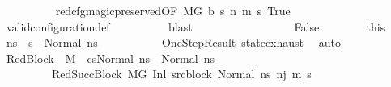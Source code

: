 \begin{isabellebody}
\ \ \ \ \ \ \ \ \isamarkupfalse%
\ red{\isacharunderscore}{\kern0pt}cfg{\isacharunderscore}{\kern0pt}magic{\isacharunderscore}{\kern0pt}preserved{\isacharbrackleft}{\kern0pt}OF\ {\isacartoucheopen}M{\isacharcomma}{\kern0pt}{\isasymLambda}{\isacharcomma}{\kern0pt}{\isasymGamma}{\isacharcomma}{\kern0pt}{\isasymOmega}{\isacharcomma}{\kern0pt}G\ {\isasymturnstile}{\isacharparenleft}{\kern0pt}b{\isacharcomma}{\kern0pt}\ s{}{\isacharparenright}{\kern0pt}\ {\isacharminus}{\kern0pt}n{\isasymrightarrow}{\isacharasterisk}{\kern0pt}\ {\isacharparenleft}{\kern0pt}m{\isacharprime}{\kern0pt}{\isacharcomma}{\kern0pt}\ s{\isacharprime}{\kern0pt}{\isacharparenright}{\kern0pt}{\isacartoucheclose}{\isacharbrackright}{\kern0pt}\ True\ \isanewline
\ \ \ \ \ \ \ \ \isamarkupfalse%
\ valid{\isacharunderscore}{\kern0pt}configuration{\isacharunderscore}{\kern0pt}def\isanewline
\ \ \ \ \ \ \ \ \isamarkupfalse%
\ blast\ \ \ \ \ \isanewline
\ \ \ \ \isamarkupfalse%
\isanewline
\ \ \ \ \ \ \isamarkupfalse%
\ False\isanewline
\ \ \ \ \ \ \isamarkupfalse%
\ this\ \isamarkupfalse%
\ ns{}\ \ {\isachardoublequoteopen}s{}\ {\isacharequal}{\kern0pt}\ Normal\ ns{}{\isachardoublequoteclose}\ \isanewline
\ \ \ \ \ \ \ \ \isamarkupfalse%
\ OneStepResult\ state{\isachardot}{\kern0pt}exhaust\ \isamarkupfalse%
\ auto\isanewline
\isanewline
\ \ \ \ \ \ \isamarkupfalse%
\ RedBlock{}{\isacharcolon}{\kern0pt}\ \ {\isachardoublequoteopen}M{\isacharcomma}{\kern0pt}{\isasymLambda}{\isacharcomma}{\kern0pt}{\isasymGamma}{\isacharcomma}{\kern0pt}{\isasymOmega}\ {\isasymturnstile}\ {\isasymlangle}cs{\isacharcomma}{\kern0pt}Normal\ ns{\isasymrangle}\ {\isacharbrackleft}{\kern0pt}{\isasymrightarrow}{\isacharbrackright}{\kern0pt}\ Normal\ ns{}{\isachardoublequoteclose}\ \isanewline
\ \ \ \ \ \ \ \ \ RedSuccBlock{\isacharcolon}{\kern0pt}\ {\isachardoublequoteopen}M{\isacharcomma}{\kern0pt}{\isasymLambda}{\isacharcomma}{\kern0pt}{\isasymGamma}{\isacharcomma}{\kern0pt}{\isasymOmega}{\isacharcomma}{\kern0pt}G\ {\isasymturnstile}{\isacharparenleft}{\kern0pt}Inl\ src{\isacharunderscore}{\kern0pt}block{\isacharunderscore}{\kern0pt}{}{\isacharcomma}{\kern0pt}\ Normal\ ns{}{\isacharparenright}{\kern0pt}\ {\isacharminus}{\kern0pt}n{\isasymrightarrow}{\isacharcircum}{\kern0pt}{\isacharparenleft}{\kern0pt}j{\isacharminus}{\kern0pt}{}{\isacharparenright}{\kern0pt}\ {\isacharparenleft}{\kern0pt}m{\isacharprime}{\kern0pt}{\isacharcomma}{\kern0pt}\ s{\isacharprime}{\kern0pt}{\isacharparenright}{\kern0pt}{\isachardoublequoteclose}\isanewline

\end{isabellebody}
